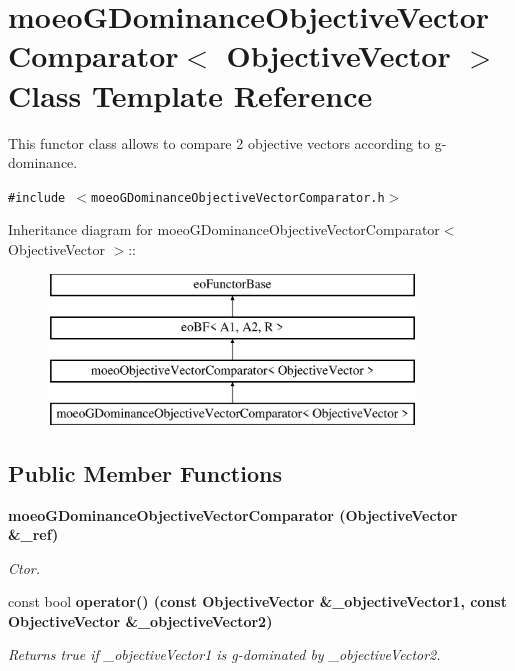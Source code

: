 \section{moeo\-GDominance\-Objective\-Vector\-Comparator$<$ Objective\-Vector $>$ Class Template Reference}
\label{classmoeoGDominanceObjectiveVectorComparator}
This functor class allows to compare 2 objective vectors according to g-dominance.  


{\tt \#include $<$moeo\-GDominance\-Objective\-Vector\-Comparator.h$>$}

Inheritance diagram for moeo\-GDominance\-Objective\-Vector\-Comparator$<$ Objective\-Vector $>$::\begin{figure}[H]
\begin{center}
\leavevmode
\includegraphics[height=4cm]{classmoeoGDominanceObjectiveVectorComparator}
\end{center}
\end{figure}
\subsection*{Public Member Functions}
\begin{CompactItemize}
\item 
\bf{moeo\-GDominance\-Objective\-Vector\-Comparator} (Objective\-Vector \&\_\-ref)
\begin{CompactList}\small\item\em Ctor. \item\end{CompactList}\item 
const bool \bf{operator()} (const Objective\-Vector \&\_\-objective\-Vector1, const Objective\-Vector \&\_\-objective\-Vector2)
\begin{CompactList}\small\item\em Returns true if \_\-objective\-Vector1 is g-dominated by \_\-objective\-Vector2. \item\end{CompactList}\end{CompactItemize}
